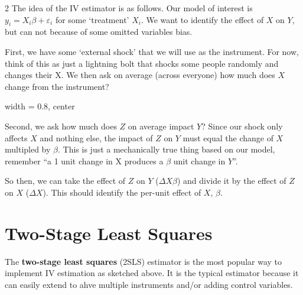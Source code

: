 \documentclass[12pt]{article}
\begin{document}
\begin{multicols}{2}
The idea of the IV estimator is as follows.
Our model of interest is $y_i = X_i \beta + \varepsilon_i$ for some `treatment' $X_i$.
We want to identify the effect of $X$ on $Y$, but can not because of some omitted variables bias.

First, we have some `external shock' that we will use as the instrument. 
For now, think of this as just a lightning bolt that shocks some people randomly and changes their X.
We then ask on average (across everyone) how much does $X$ change from the instrument? 

\bigskip
\begin{adjustbox}{width = 0.8\linewidth, center}
\end{adjustbox}
\bigskip

Second, we ask how much does $Z$ on average impact $Y$? 
Since our shock only affects $X$ and nothing else, the impact of $Z$ on $Y$ must equal the change of $X$ multipled by $\beta$. 
This is just a mechanically true thing based on our model, remember ``a 1 unit change in X produces a $\beta$ unit change in $Y$''.

So then, we can take the effect of $Z$ on $Y$ ($\Delta X \beta$) and divide it by the effect of $Z$ on $X$ ($\Delta X$). 
This should identify the per-unit effect of $X$, $\beta$.




\section*{Two-Stage Least Squares}

The \textbf{two-stage least squares} (2SLS) estimator is the most popular way to implement IV estimation as sketched above. 
It is the typical estimator because it can easily extend to ahve multiple instruments and/or adding control variables.



\end{multicols}
\end{document}
